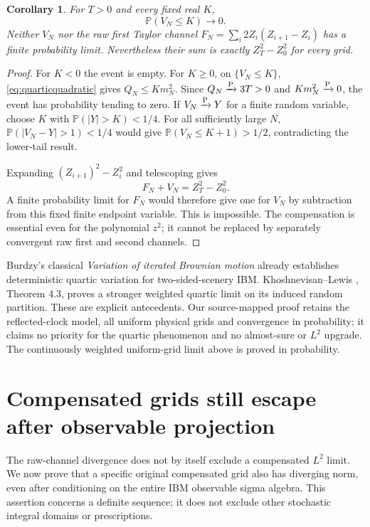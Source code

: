 \documentclass[11pt]{article}
\newtheorem{corollary}[theorem]{Corollary}
\theoremstyle{remark}\newtheorem{remark}[theorem]{Remark}
\begin{document}
\begin{corollary}\label{cor:quadratic}
For $T>0$ and every fixed real $K$,
\[
 \mathbb P(V_N\leq K)\longrightarrow0.
\]
Neither $V_N$ nor the raw first Taylor channel
$F_N=\sum_i2Z_i(Z_{i+1}-Z_i)$ has a finite probability limit.
Nevertheless their sum is exactly $Z_T^2-Z_0^2$ for every grid.
\end{corollary}
\begin{proof}
For $K<0$ the event is empty. For $K\geq0$, on
$\{V_N\leq K\}$, \eqref{eq:quarticquadratic} gives
$Q_N\leq Km_N^2$. Since $Q_N\xrightarrow{\mathrm P}3T>0$ and
$Km_N^2\xrightarrow{\mathrm P}0$, the event has probability tending to zero.
If $V_N\xrightarrow{\mathrm P} Y$ for a finite random variable, choose $K$
with $\mathbb P(|Y|>K)<1/4$. For all sufficiently large $N$,
$\mathbb P(|V_N-Y|>1)<1/4$ would give
$\mathbb P(V_N\leq K+1)>1/2$, contradicting the lower-tail result.

Expanding $(Z_{i+1})^2-Z_i^2$ and telescoping gives
\[
 F_N+V_N=Z_T^2-Z_0^2.
\]
A finite probability limit for $F_N$ would therefore give one for
$V_N$ by subtraction from this fixed finite endpoint variable.
This is impossible. The compensation is essential even for the
polynomial $z^2$; it cannot be replaced by separately convergent
raw first and second channels.
\end{proof}

Burdzy's classical \emph{Variation of iterated Brownian motion}
\cite{burdzy} already establishes deterministic quartic variation
for two-sided-scenery IBM. Khoshnevisan--Lewis \cite{kl}, Theorem 4.3,
proves a stronger weighted quartic limit on its induced random
partition. These are explicit antecedents. Our source-mapped proof
retains the reflected-clock model, all uniform physical grids and
convergence in probability; it claims no priority for the quartic
phenomenon and no almost-sure or $L^2$ upgrade. The continuously weighted
uniform-grid limit above is proved in probability.


\section{Compensated grids still escape after observable projection}
The raw-channel divergence does not by itself exclude a compensated
$L^2$ limit. We now prove that a specific original compensated grid
also has diverging norm, even after conditioning on the entire IBM
observable sigma algebra. This assertion concerns a definite sequence;
it does not exclude other stochastic integral domains or prescriptions.
\end{document}
